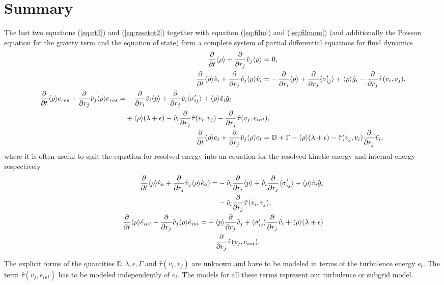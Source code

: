 \section{Summary}
The last two equations (\ref{eq:et2}) and (\ref{eq:resetot2}) together with
equation 
(\ref{eq:film}) and (\ref{eq:filmom}) (and additionally the Poisson equation for
the gravity term and the equation of state) form a complete system of partial
differential equations for fluid dynamics
\begin{align}
\frac{\partial}{\partial t}\langle \rho \rangle + \frac{\partial}{\partial r_j}\hat{v}_j\langle \rho \rangle =&\ 0, \label{eq:filmsum}\\
\frac{\partial}{\partial t}\langle \rho \rangle\hat{v}_i + \frac{\partial}{\partial r_j}\hat{v}_j\langle \rho \rangle\hat{v}_i =&
-\frac{\partial}{\partial r_i}\langle p \rangle+\frac{\partial}{\partial r_j}\langle \sigma'_{ij} \rangle+\langle \rho \rangle\hat{g}_i
-\frac{\partial}{\partial r_j}\hat{\tau}(v_i,v_j),\label{eq:filmomsum}\\
\begin{split}
\frac{\partial}{\partial t}\langle \rho \rangle e_{res}+\frac{\partial}{\partial r_j}\hat{v}_j\langle \rho \rangle e_{res}=&
-\frac{\partial}{\partial r_i}\hat{v}_i\langle p \rangle
+\frac{\partial}{\partial r_j}\hat{v}_i\langle \sigma'_{ij} \rangle+\langle \rho \rangle\hat{v}_i\hat{g}_i\\
&+\langle \rho \rangle(\lambda+\epsilon)
-\hat{v}_i\frac{\partial}{\partial r_j}\hat{\tau}(v_i,v_j)
-\frac{\partial}{\partial r_j}\hat{\tau}(v_j,e_{int}),
\end{split}\label{eq:filresetotsum}
\\
\frac{\partial}{\partial t}\langle \rho \rangle e_t+\frac{\partial}{\partial r_j}\hat{v}_j
\langle \rho \rangle e_t=&\ \mathbb{D}+\Gamma-\langle \rho \rangle(\lambda+\epsilon)
-\hat{\tau}(v_j,v_i)\frac{\partial}{\partial r_j}\hat{v_i}\label{eq:etsum},
\end{align}
where it is often useful to split the equation for resolved energy into an
equation for the resolved kinetic energy and internal energy respectively
\begin{align}
\begin{split}
\frac{\partial}{\partial t}\langle \rho \rangle \hat{e}_k+\frac{\partial}{\partial r_j}\hat{v}_j \langle \rho \rangle \hat{e}_k) =& 
-\hat{v}_i \frac{\partial}{\partial r_i}\langle p \rangle
+\hat{v}_i \frac{\partial}{\partial r_j}\langle \sigma'_{ij} \rangle
+\langle \rho \rangle \hat{v}_i \hat{g}_i\\
&-\hat{v}_i\frac{\partial}{\partial r_j}\hat{\tau}(v_i,v_j), \label{eq:filkinsum}
\end{split}
\\
\begin{split}
\frac{\partial}{\partial t}\langle \rho \rangle \hat{e}_{int}+\frac{\partial}{\partial r_j}\hat{v}_j \langle \rho \rangle \hat{e}_{int} =&
-\langle p \rangle \frac{\partial}{\partial r_j}\hat{v}_j 
+\langle \sigma'_{ij} \rangle\frac{\partial}{\partial r_j}\hat{v}_i
+\langle \rho \rangle(\lambda+\epsilon)\\
&-\frac{\partial}{\partial r_j}\hat{\tau}(v_j,e_{int}).\label{eq:filintsum}
\end{split}
\end{align}

The explicit forms of the quantities $\mathbb{D},\lambda,\epsilon,\Gamma$ and
$\hat{\tau}(v_i,v_j)$ are unknown and have to be modeled in terms of the
turbulence energy $e_t$.
The term $\hat{\tau}(v_j,e_{int})$ has to be modeled independently of $e_t$. The
models for all these terms represent our turbulence or subgrid model.

